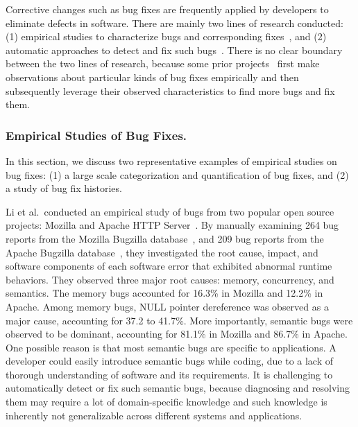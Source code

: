 Corrective changes such as bug fixes are frequently applied by developers to eliminate defects in software. There are mainly two lines of research conducted: (1) empirical studies to characterize bugs and corresponding fixes~\cite{Fenton2000:QAF,Li2006:TCE,Kim2006:MBF,Lu2008:LMC,Nguyen2010:RBF,Yin2011:FBB,Park2012:supplementary,Zhong2015:ESR}, and (2) automatic approaches to detect and fix such bugs~\cite{Engler2000:CSR,Bush2000:SAF,Hangal2002:TDS,Hovemeyer2004:FBE,Naik2006:ESR,Weimer2009:AFP}. There is no clear boundary between the two lines of research, because some prior projects~\cite{Li2006:CPMiner,Pham2010:DRS,Jin2012:UDR,Kim2013:PAR} first make observations about particular kinds of bug fixes empirically and then subsequently leverage their observed characteristics to find more bugs and fix them. 

\subsubsection{Empirical Studies of Bug Fixes.}
In this section, we discuss two representative examples of empirical studies on bug fixes: (1) a large scale categorization and quantification of bug fixes, and (2) a study of bug fix histories. 

Li et al.~conducted an empirical study of bugs from two popular open source projects: Mozilla and Apache HTTP Server~\cite{Li2006:TCE}. By manually examining 264 bug reports from the Mozilla Bugzilla database~\cite{mozilla}, and 209 bug reports from the Apache Bugzilla database~\cite{asf}, they investigated the root cause, impact, and software components of each software error that exhibited abnormal runtime behaviors. They observed three major root causes: memory, concurrency, and semantics. The memory bugs accounted for 16.3\% in Mozilla and 12.2\% in Apache. Among memory bugs, NULL pointer dereference was observed as a major cause, accounting for 37.2 to 41.7\%. More importantly, semantic bugs were observed to be dominant, accounting for 81.1\% in Mozilla and 86.7\% in Apache. One possible reason is that most semantic bugs are specific to applications. A developer could easily introduce semantic bugs while coding, due to a lack of thorough understanding of software and its requirements. It is challenging to automatically detect or fix such semantic bugs, because diagnosing and resolving them may require a lot of domain-specific knowledge and such knowledge is inherently not generalizable across different systems and applications.   

